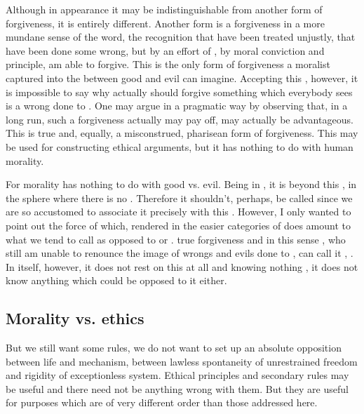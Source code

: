 {{\pa %
Although in appearance it may be indistinguishable from another
form of forgiveness, it is entirely different.  Another form is a
forgiveness in a more mundane sense of the word, the recognition that
 have been treated unjustly, that  have been done some
wrong, but by an effort of , by  moral conviction 
and principle,  am able to
forgive.  This is the only form of forgiveness a moralist captured
into the  between good and evil can imagine. 
Accepting this , however, it is impossible to say why
actually  should forgive something which everybody sees is a
wrong done to .  One may argue in a pragmatic way by observing 
that, in a long run, such a forgiveness actually may pay off, may 
actually be advantageous. This is true and, equally, a misconstrued,  
pharisean form of forgiveness. This may be used for constructing 
ethical arguments, but it has nothing to do with human morality.

\pa
For morality has nothing to do with good vs. evil. Being  
in , it is beyond this , in the sphere where 
there is no . Therefore it shouldn't, perhaps, be called 
 since we are so accustomed to associate it precisely 
with this . However, I only wanted to point out the 
force of  which, rendered in the easier categories of 
 does amount to what we tend to call  as 
opposed to  or . 
  true forgiveness and in this sense , who 
still am unable to renounce the image of wrongs and evils done to 
, can call it , . 
In 
itself, however, it does not rest on this  at all and 
knowing nothing , it does not know anything which could be 
opposed to it either.


%
\subsection{Morality vs. ethics}\label{se:morals}
%
\pa But we still want some rules, we do not want to set up an absolute
opposition between life and mechanism, between lawless spontaneity of
unrestrained freedom and rigidity of exceptionless system.  Ethical
principles and secondary rules may be useful and there need not be
anything wrong with them.  But they are useful for purposes which are
of very different order than those addressed here.

}}

